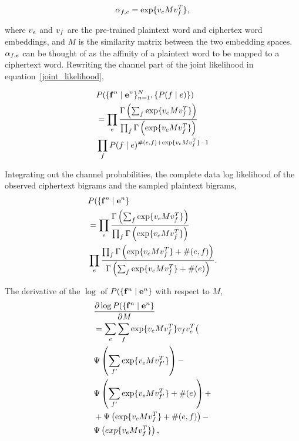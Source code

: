 \begin{equation}
\alpha_{f,e} = \exp \{ v_{e}  M  v_{f}^T \},
\end{equation}

where $v_{e}$ and $v_{f}$ are the pre-trained plaintext word and ciphertex word embeddings, and $M$ is the similarity matrix between the two embedding spaces. $\alpha_{f,e}$ can be thought of as the affinity of a plaintext word to be mapped to a ciphertext word. Rewriting the channel part of the joint likelihood in equation~\ref{joint_likelihood}, 

\begin{align*}
&P( \{ \mathbf{f}^n \mid \mathbf{e}^n \}_{n=1}^{N}, \{ P(f \mid e) \})  \\
&=\prod_{e}  \frac{\Gamma \left( \sum_{f} \exp \{ v_{e}  M  v_{f}^T \}  \right)} {\prod_{f} \Gamma \left( \exp \{ v_{e}  M  v_{f}^T \} \right)} \\
& \prod_{f} P(f \mid e)^{\#(e,f)+ \exp \{ v_{e}  M  v_{f}^T \} -1} 
\end{align*}

Integrating out the channel probabilities, the complete data log likelihood of the observed ciphertext bigrams and the sampled plaintext bigrams,
\begin{align}
&P( \{ \mathbf{f}^n \mid \mathbf{e}^n \} \\
&= \prod_{e}  \frac{\Gamma \left( \sum_{f} \exp \{ v_{e}  M  v_{f}^T \}  \right)} {\prod_{f} \Gamma \left( \exp \{ v_{e}  M  v_{f}^T \} \right)} \\
& \prod_{e}  \frac{\prod_{f} \Gamma \left( \exp \{ v_{e}  M  v_{f}^T \} + \#(e,f) \right)} {\Gamma \left( \sum_{f} \exp \{ v_{e}  M  v_{f}^T \} + \#(e) \right)}.
\end{align}

The derivative of the $\log$ of $P( \{ \mathbf{f}^n \mid \mathbf{e}^n \}$ with respect to $M$, 
\begin{align}
&\frac {\partial \log P( \{ \mathbf{f}^n \mid \mathbf{e}^n \}}{\partial M}  \\
& = \sum_{e}  \sum_{f} \exp \{ v_{e}  M  v_{f}^T \}  v_{f} v_{e}^T \bigl( \\
& \Psi \left( \sum_{f'} \exp \{ v_{e}  M  v_{f'}^T \} \right) - \\
& \Psi \left( \sum_{f'} \exp \{ v_{e}  M  v_{f'}^T \} + \#(e) \right)  + \\
& + \Psi \left( \exp \{ v_{e}  M  v_{f}^T \} + \#(e,f) \right) - \\
& \Psi \left( exp \{ v_{e}  M  v_{f}^T \} \right), 
\end{align}

